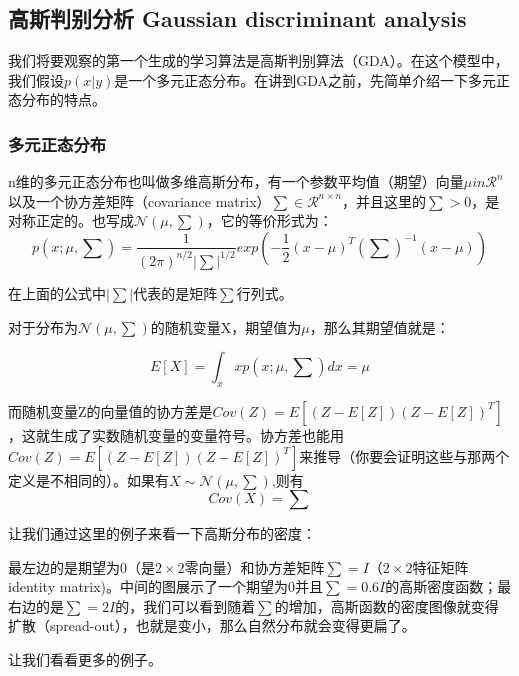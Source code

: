 \documentclass[UTF8]{ctexart}
\begin{document}
\subsection{高斯判别分析 Gaussian discriminant analysis}


我们将要观察的第一个生成的学习算法是高斯判别算法（GDA）。在这个模型中，我们假设$p(x|y)$是一个多元正态分布。在讲到GDA之前，先简单介绍一下多元正态分布的特点。


\subsubsection{多元正态分布}

n维的多元正态分布也叫做多维高斯分布，有一个参数平均值（期望）向量$\mu in \mathcal{R}^{n}$以及一个协方差矩阵（covariance matrix）$\sum \in \mathcal{R}^{n\times n}$，并且这里的$\sum > 0 $，是对称正定的。也写成$\mathcal{N} (\mu,\sum)$，它的等价形式为：\[ p(x;\mu,\sum) = \frac{1}{(2\pi)^{n/2}|\sum|^{1/2}}exp(-\frac{1}{2}(x-\mu)^{T} (\sum)^{-1}(x-\mu)) \]

在上面的公式中$|\sum|$代表的是矩阵$\sum$行列式。

对于分布为$\mathcal{N} (\mu,\sum)$的随机变量X，期望值为$\mu$，那么其期望值就是：

\[ E[X] = \int_x x p(x;\mu,\sum)dx = \mu \]

而随机变量Z的向量值的协方差是$Cov(Z)= E[(Z-E[Z])(Z-E[Z])^{T}]$，这就生成了实数随机变量的变量符号。协方差也能用$Cov(Z)= E[(Z-E[Z])(Z-E[Z])^{T}]$来推导（你要会证明这些与那两个定义是不相同的）。如果有$X \sim \mathcal{N}(\mu,\sum)$,则有
\[Cov(X)=\sum\]

让我们通过这里的例子来看一下高斯分布的密度：

\begin{figure}[htb]        
\end{figure}

最左边的是期望为0（是$2 \times 2 $零向量）和协方差矩阵$\sum = I$（$2\times 2$特征矩阵 identity matrix)。中间的图展示了一个期望为0并且$\sum = 0.6I$的高斯密度函数；最右边的是$\sum = 2I$的，我们可以看到随着$\sum$的增加，高斯函数的密度图像就变得扩散（spread-out），也就是变小，那么自然分布就会变得更扁了。

让我们看看更多的例子。

\begin{figure}[htb]        
\end{figure}
\end{document}
